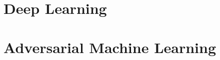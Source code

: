 \documentclass{article}
\begin{document}
\section{Deep Learning}

\section{Adversarial Machine Learning}




\end{document}
